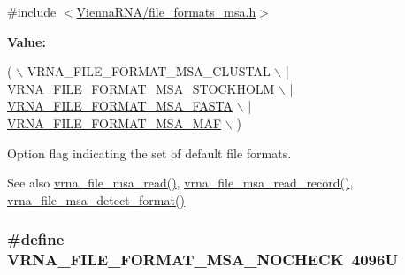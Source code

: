 {\ttfamily \#include $<$\hyperlink{file__formats__msa_8h}{Vienna\+R\+N\+A/file\+\_\+formats\+\_\+msa.\+h}$>$}

{\bfseries Value\+:}
\begin{DoxyCode}
( \(\backslash\)
                                              VRNA\_FILE\_FORMAT\_MSA\_CLUSTAL \(\backslash\)
                                            | \hyperlink{group__file__utils_ga62be992445cd8ab2ad7a8fded944338b}{VRNA\_FILE\_FORMAT\_MSA\_STOCKHOLM} 
      \(\backslash\)
                                            | \hyperlink{group__file__utils_gacf6274a2c825f34e4131404665b00604}{VRNA\_FILE\_FORMAT\_MSA\_FASTA} \(\backslash\)
                                            | \hyperlink{group__file__utils_gab3186d774c01570d2a47d0308eec4927}{VRNA\_FILE\_FORMAT\_MSA\_MAF} \(\backslash\)
                                          )
\end{DoxyCode}


Option flag indicating the set of default file formats. 

\begin{DoxySeeAlso}{See also}
\hyperlink{group__file__utils_gad02d5d12bda54611c915a1019323b7be}{vrna\+\_\+file\+\_\+msa\+\_\+read()}, \hyperlink{group__file__utils_gad4203a438622b2df7bc2f16578d54799}{vrna\+\_\+file\+\_\+msa\+\_\+read\+\_\+record()}, \hyperlink{group__file__utils_gade4fa8136ebb2d0f7eb3f8b59a8658e3}{vrna\+\_\+file\+\_\+msa\+\_\+detect\+\_\+format()} 
\end{DoxySeeAlso}
\subsubsection[{\texorpdfstring{V\+R\+N\+A\+\_\+\+F\+I\+L\+E\+\_\+\+F\+O\+R\+M\+A\+T\+\_\+\+M\+S\+A\+\_\+\+N\+O\+C\+H\+E\+CK}{VRNA_FILE_FORMAT_MSA_NOCHECK}}]{\setlength{\rightskip}{0pt plus 5cm}\#define V\+R\+N\+A\+\_\+\+F\+I\+L\+E\+\_\+\+F\+O\+R\+M\+A\+T\+\_\+\+M\+S\+A\+\_\+\+N\+O\+C\+H\+E\+CK~4096U}\hypertarget{group__file__utils_ga229fb3778ecabea4782902b69fa48fd1}{}\label{group__file__utils_ga229fb3778ecabea4782902b69fa48fd1}


